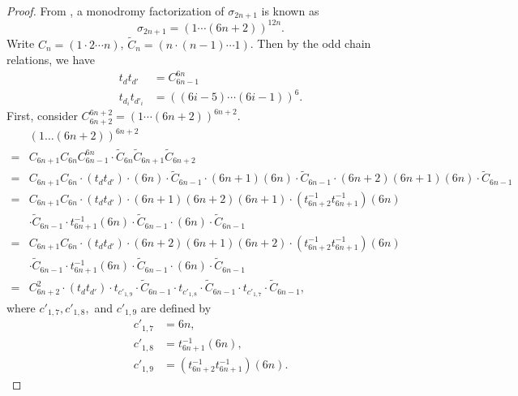 \documentclass[10pt,a4paper,reqno]{amsart}
\theoremstyle{definition}
\numberwithin{equation}{section}
\numberwithin{figure}{section}
\begin{document}
\begin{proof}
From \cite{I}, a monodromy factorization of $\sigma_{2n+1}$ is known as \[\sigma_{2n+1}=(1\cdots (6n+2))^{12n}.\]
Write $C_n=(1\cdot 2 \cdots n)$, $\tilde{C}_n=(n \cdot (n-1) \cdots 1)$.
Then by the odd chain relations, we have 
\begin{equation}
\begin{aligned} \label{eq:dd'}
t_{d}t_{d'}&= C_{6n-1}^{6n}\\
t_{d_{i}}t_{d'_i}&=((6i-5)\cdots (6i-1))^6.
\end{aligned}
\end{equation}
First, consider $C_{6n+2}^{6n+2}=(1\cdots (6n+2))^{6n+2}$.
\begin{align*}
&(1\dots (6n+2))^{6n+2}\\
=&C_{6n+1}C_{6n}C_{6n-1}^{6n} \cdot \tilde{C}_{6n} \tilde{C}_{6n+1}\tilde{C}_{6n+2} \\
=&C_{6n+1}C_{6n} \cdot (t_{d}  t_{d'}) \cdot (6n) \cdot \tilde{C}_{6n-1} \cdot (6n+1)(6n)\cdot \tilde{C}_{6n-1} \cdot (6n+2)(6n+1)(6n)\cdot \tilde{C}_{6n-1} \\
=&C_{6n+1}C_{6n} \cdot (t_{d} t_{d'}) \cdot (6n+1)(6n+2)(6n+1)\cdot (t_{6n+2}^{-1}t_{6n+1}^{-1})(6n) \\
&\cdot \tilde{C}_{6n-1}  \cdot t_{6n+1}^{-1}(6n)\cdot \tilde{C}_{6n-1} \cdot (6n)\cdot \tilde{C}_{6n-1}\\
=&C_{6n+1}C_{6n} \cdot (t_{d} t_{d'}) \cdot (6n+2)(6n+1)(6n+2)\cdot (t_{6n+2}^{-1}t_{6n+1}^{-1})(6n)  \\
&\cdot \tilde{C}_{6n-1} \cdot t_{6n+1}^{-1}(6n)\cdot \tilde{C}_{6n-1} \cdot (6n) \cdot \tilde{C}_{6n-1}\\
=&C_{6n+2}^2 \cdot (t_{d} t_{d'})  \cdot t_{{c}'_{1,9}} \cdot \tilde{C}_{6n-1}\cdot  t_{{c}'_{1,8}}\cdot \tilde{C}_{6n-1} \cdot t_{{c}'_{1,7}} \cdot \tilde{C}_{6n-1},
\end{align*}
where ${c}'_{1,7},  {c}'_{1,8},$ and ${c}'_{1,9}$ are defined by
\begin{align}
{c}'_{1,7}&=6n,\\ 
{c}'_{1,8}&=t_{6n+1}^{-1}(6n), \\ 
{c}'_{1,9}&=(t_{6n+2}^{-1}t_{6n+1}^{-1})(6n). 
\end{align}


\end{proof}
\end{document}
